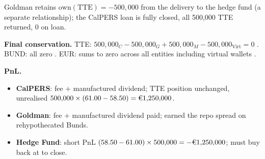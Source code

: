 \noindent Goldman retains $\mathrm{own}(\text{TTE}) = -500{,}000$ from the delivery to the hedge fund (a separate relationship); the CalPERS loan is fully closed, all 500{,}000 TTE returned, 0 on loan.

\noindent\textbf{Final conservation.} TTE: $500{,}000_C - 500{,}000_G + 500{,}000_M - 500{,}000_{\mathrm{Virt}} = 0$ \checkmark. BUND: all zero \checkmark. EUR: sums to zero across all entities including virtual wallets \checkmark.

\noindent\textbf{PnL.}
\begin{itemize}[nosep]
\item \textbf{CalPERS}:  fee $+$  manufactured dividend; TTE position unchanged, unrealised $500{,}000 \times (61.00 - 58.50) = \text{\EUR{1,250,000}}$.
\item \textbf{Goldman}:  fee $+$  manufactured dividend paid; earned the repo spread on rehypothecated Bunds.
\item \textbf{Hedge Fund}: short PnL $(58.50 - 61.00) \times 500{,}000 = -\text{\EUR{1,250,000}}$; must buy back at  to close.
\end{itemize}
